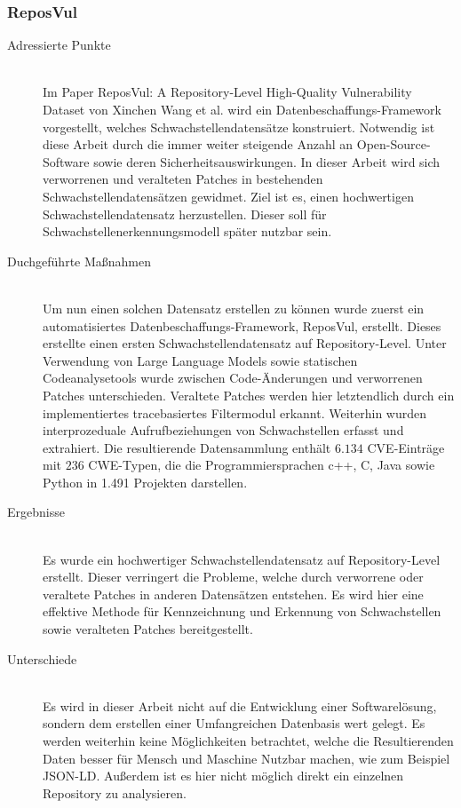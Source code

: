 \subsubsection{ReposVul} \label{sec:ReposVul}
    \begin{description}
        \item[Adressierte Punkte]\hfill \\
            Im Paper \glqq ReposVul: A Repository-Level High-Quality Vulnerability Dataset\grqq\textsuperscript{\cite{article:wang2024reposvul}} von Xinchen Wang et al. wird ein Datenbeschaffungs-Framework vorgestellt, welches Schwachstellendatensätze konstruiert.
            Notwendig ist diese Arbeit durch die immer weiter steigende Anzahl an Open-Source-Software sowie deren Sicherheitsauswirkungen.
            In dieser Arbeit wird sich verworrenen und veralteten Patches in bestehenden Schwachstellendatensätzen gewidmet.
            Ziel ist es, einen hochwertigen Schwachstellendatensatz herzustellen.
            Dieser soll für Schwachstellenerkennungsmodell später nutzbar sein.
        \item[Duchgeführte Maßnahmen]\hfill \\
            Um nun einen solchen Datensatz erstellen zu können wurde zuerst ein automatisiertes Daten\-be\-schaffungs-Framework, \glqq ReposVul\grqq, erstellt.
            Dieses erstellte einen ersten Schwachstellendatensatz auf Repository-Level.
            Unter Verwendung von Large Language Models sowie statischen Codeanalysetools wurde zwischen Code-Änderungen und verworrenen Patches unterschieden.
            Veraltete Patches werden hier letztendlich durch ein implementiertes tracebasiertes Filtermodul erkannt.
            Weiterhin wurden interprozeduale Aufrufbeziehungen von Schwachstellen erfasst und extrahiert.
            Die resultierende Datensammlung enthält $6.134$ CVE-Einträge mit $236$ CWE-Typen, die die Programmiersprachen c++, C, Java sowie Python in 1.491 Projekten darstellen.
        \item[Ergebnisse]\hfill \\
            Es wurde ein hochwertiger Schwachstellendatensatz auf Repository-Level erstellt.
            Dieser verringert die Probleme, welche durch verworrene oder veraltete Patches in anderen Datensätzen entstehen.
            Es wird hier eine effektive Methode für Kennzeichnung und Erkennung von Schwachstellen sowie veralteten Patches bereitgestellt.
        \item[Unterschiede]\hfill \\
            Es wird in dieser Arbeit nicht auf die Entwicklung einer Softwarelösung, sondern dem erstellen einer Umfangreichen Datenbasis wert gelegt.
            Es werden weiterhin keine Möglichkeiten betrachtet, welche die Resultierenden Daten besser für Mensch und Maschine Nutzbar machen, wie zum Beispiel \ac{JSON-LD}.
            Außerdem ist es hier nicht möglich direkt ein einzelnen Repository zu analysieren.
    \end{description}